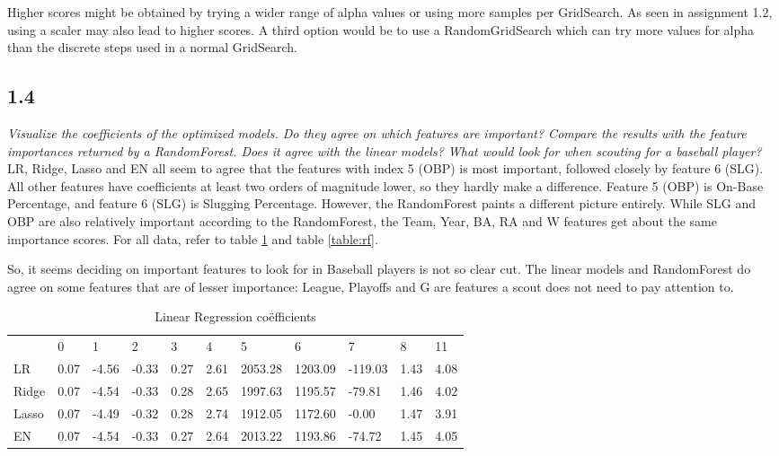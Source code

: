 Higher scores might be obtained by trying a wider range of alpha values or using more samples per GridSearch. As seen in assignment 1.2, using a scaler may also lead to higher scores. A third option would be to use a RandomGridSearch which can try more values for alpha than the discrete steps used in a normal GridSearch. \\






\subsection{1.4}
{\it Visualize the coefficients of the optimized models. Do they agree on which features are
important? Compare the results with the feature importances returned by a RandomForest. Does it agree with the linear models? What would look for when scouting for a baseball player?}\\

LR, Ridge, Lasso and EN all seem to agree that the features with index 5 (OBP) is most important, followed closely by feature 6 (SLG). All other features have coefficients at least two orders of magnitude lower, so they hardly make a difference. Feature 5 (OBP) is On-Base Percentage, and feature 6 (SLG) is Slugging Percentage. However, the RandomForest paints a different picture entirely. While SLG and OBP are also relatively important according to the RandomForest, the Team, Year, BA, RA and W features get about the same importance scores. For all data, refer to table \ref{table:coefficients} and table \ref{table:rf}.

So, it seems deciding on important features to look for in Baseball players is not so clear cut. The linear models and RandomForest do agree on some features that are of lesser importance: League, Playoffs and G are features a scout does not need to pay attention to. \\

\begin{table}[]
\centering
\caption{Linear Regression coëfficients}
\label{table:coefficients}
\begin{tabular}{lllllllllll}
      & 0    & 1     & 2     & 3    & 4    & 5       & 6       & 7       & 8    & 11   \\
LR    & 0.07 & -4.56 & -0.33 & 0.27 & 2.61 & 2053.28 & 1203.09 & -119.03 & 1.43 & 4.08 \\
Ridge & 0.07 & -4.54 & -0.33 & 0.28 & 2.65 & 1997.63 & 1195.57 & -79.81  & 1.46 & 4.02 \\
Lasso & 0.07 & -4.49 & -0.32 & 0.28 & 2.74 & 1912.05 & 1172.60 & -0.00   & 1.47 & 3.91 \\
EN    & 0.07 & -4.54 & -0.33 & 0.27 & 2.64 & 2013.22 & 1193.86 & -74.72  & 1.45 & 4.05
\end{tabular}
\end{table}

